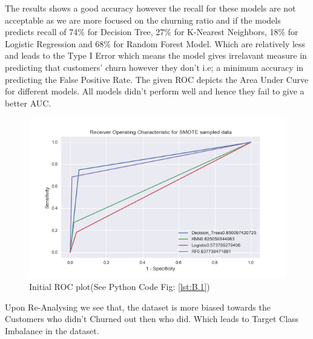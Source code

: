 \documentclass[a4paper,12pt]{report}
\begin{document}
The results shows a good accuracy however the recall for these models are not acceptable as  we are more focused on the churning ratio and if the models predicts recall of 74\% for Decision Tree, 27\% for K-Nearest Neighbors, 18\% for Logistic Regression and 68\% for Random Forest Model. Which are relatively less and leads to the Type I Error which means the model gives irrelavant measure  in predicting that customers' churn however they don't  i.e; a minimum accuracy in predicting the False Positive Rate. The given ROC depicts the Area Under Curve for different models. All models didn't perform well and hence they fail to  give a better AUC.
\begin{figure}[h]
\vspace{-5pt}
\centering
\includegraphics[scale = 0.7]{Imb_ROC.PNG}
\caption{Initial ROC plot(See Python Code Fig: \ref{lst:B.1})}
\label{fig:3.3}
\end{figure}
\FloatBarrier
Upon Re-Analysing we see that, the dataset is more biased towards the Customers who didn't Churned out then who did. Which leads to Target Class Imbalance in the dataset.
\end{document}
